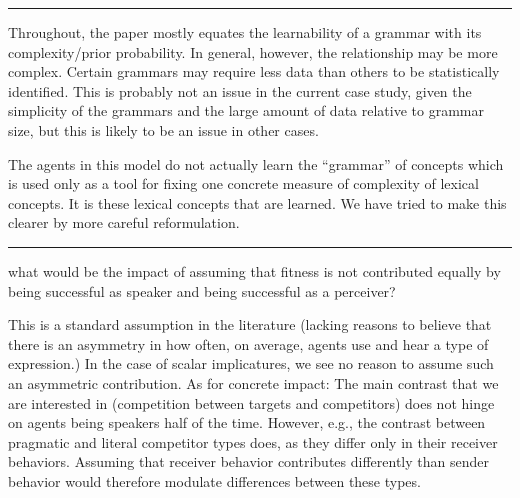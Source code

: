 \documentclass[12pt,a4paper]{article}
\begin{document}
%

\vspace{0.5cm}

\noindent\rule{\textwidth}{1pt}

\begin{mdframed}[backgroundcolor=gray!25,linecolor=gray!25,frametitle= Reviewer \thereviewerCounter~comment \thereviewerCommentCounter \hfill ~~({\it Learnability})]
%
Throughout, the paper mostly equates the learnability of a grammar with its complexity/prior probability. In general, however, the relationship may be more complex. Certain grammars may require less data than others to be statistically identified. This is probably not an issue in the current case study, given the simplicity of the grammars and the large amount of data relative to grammar size, but this is likely to be an issue in other cases.

%
\end{mdframed}

The agents in this model do not actually learn the ``grammar'' of concepts which is used only as a tool for fixing one concrete measure of complexity of lexical concepts. It is these lexical concepts that are learned. We have tried to make this clearer by more careful reformulation.

%


\noindent\rule{\textwidth}{1pt}

\begin{mdframed}[backgroundcolor=gray!25,linecolor=gray!25,frametitle= Reviewer \thereviewerCounter~comment \thereviewerCommentCounter \hfill ~~({\it expected utility})]
%
what would be the impact of assuming that fitness is not contributed equally by being successful as speaker and being successful as a perceiver?

%
\end{mdframed}

This is a standard assumption in the literature (lacking reasons to believe that there is an asymmetry in how often, on average, agents use and hear a type of expression.) In the case of scalar implicatures, we see no reason to assume such an asymmetric contribution. As for concrete impact: The main contrast that we are interested in (competition between targets and competitors) does not hinge on agents being speakers half of the time. However, e.g., the contrast between pragmatic and literal competitor types does, as they differ only in their receiver behaviors. Assuming that receiver behavior contributes differently than sender behavior would therefore modulate differences between these types.
\end{document}
